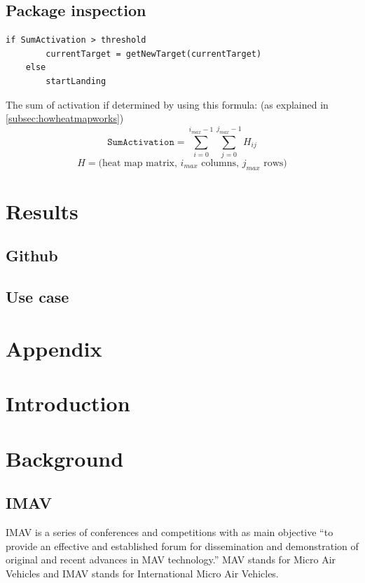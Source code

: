 \documentclass[a4paper,10pt]{article}
\begin{document}
\subsection{Package inspection\label{sec:packageinspection}}
\begin{verbatim}
if SumActivation > threshold
        currentTarget = getNewTarget(currentTarget)
    else
        startLanding
\end{verbatim}
The sum of activation if determined by using this formula: (as explained in \ref{subsec:howheatmapworks})
\[\texttt{SumActivation} = \sum_{i=0}^{i_{max}-1} \sum_{j=0}^{j_{max}-1} H_{ij}\]
\[H = \textrm{(heat map matrix, $i_{max}$ columns, $j_{max}$ rows)}\]

\section{Results}

\subsection{Github}
\subsection{Use case}

\section{Appendix}

\section{Introduction}
\section{Background}
\label{sec:background}
\subsection{IMAV}
IMAV is a series of conferences and competitions with as main objective
``to provide an effective and established forum for dissemination and
demonstration of original and recent advances in MAV technology.''\cite{imav}
MAV stands for Micro Air Vehicles and IMAV stands for International
Micro Air Vehicles.
\end{document}
